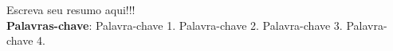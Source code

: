 
\begin{resumo}[RESUMO]
\begin{SingleSpacing}

Escreva seu resumo aqui!!!\\

\textbf{Palavras-chave}: Palavra-chave 1. Palavra-chave 2. Palavra-chave 3. Palavra-chave 4.

\end{SingleSpacing}
\end{resumo}


